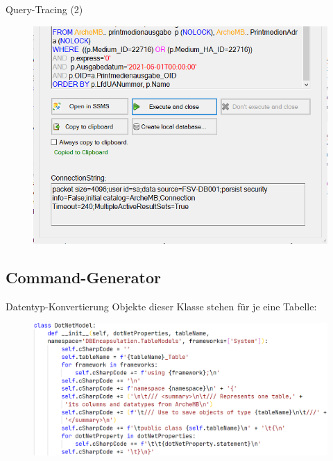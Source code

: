 \documentclass[toc]{beamer}
\begin{document}
        \begin{frame}{Query-Tracing (2)}
            \begin{figure}[htp]
                \includegraphics[scale=0.38]{gui_crop.png}
            \end{figure}
        \end{frame}
        
    \subsection{Command-Generator}
        \begin{frame}{Datentyp-Konvertierung}
        Objekte dieser Klasse stehen für je eine Tabelle:
            \begin{figure}[htp]
                \includegraphics[scale=0.36]{dotNetModel.PNG}
            \end{figure}
        \end{frame}
        
\end{document}

